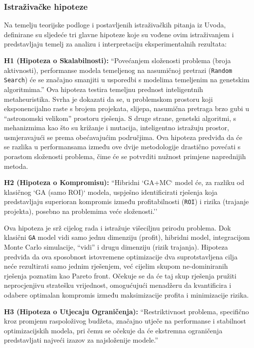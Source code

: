 \subsubsection{Istraživačke hipoteze}
Na temelju teorijske podloge i postavljenih istraživačkih pitanja iz Uvoda, definirane su sljedeće tri glavne hipoteze koje su vođene ovim istraživanjem i  predstavljaju temelj za analizu i interpretaciju eksperimentalnih rezultata:

\begin{description}

\item \textbf{H1 (Hipoteza o Skalabilnosti):} ``Povećanjem složenosti problema (broja aktivnosti), performanse modela temeljenog na nasumičnoj pretrazi (\texttt{Random Search}) će se značajno smanjiti u usporedbi s modelima temeljenim na genetskim algoritmima.''
Ova hipoteza testira temeljnu prednost inteligentnih metaheuristika. Svrha je dokazati da se, u problemskom prostoru koji eksponencijalno raste s brojem projekata, slijepa, nasumična pretraga brzo gubi u ``astronomski velikom'' prostoru rješenja. S druge strane, genetski algoritmi, s mehanizmima kao što su križanje i mutacija, inteligentno istražuju prostor, usmjeravajući se prema obećavajućim područjima. Ova hipoteza predviđa da će se razlika u performansama između ove dvije metodologije drastično povećati s porastom složenosti problema, čime će se potvrditi nužnost primjene naprednijih metoda.

\item \textbf{H2 (Hipoteza o Kompromisu):} ``Hibridni `GA+MC` model će, za razliku od klasičnog `GA (samo ROI)` modela, uspješno identificirati rješenja koja predstavljaju superioran kompromis između profitabilnosti (\texttt{ROI}) i rizika (trajanje projekta), posebno na problemima veće složenosti.''

Ova hipoteza je srž cijelog rada i istražuje višeciljnu prirodu problema. Dok klasični \texttt{GA} model vidi samo jednu dimenziju (profit), hibridni model, integracijom Monte Carlo simulacije, ``vidi'' i drugu dimenziju (rizik trajanja). Hipoteza predviđa da ova sposobnost istovremene optimizacije dva suprotstavljena cilja neće rezultirati samo jednim rješenjem, već cijelim skupom ne-dominiranih rješenja poznatim kao Pareto front. Očekuje se da će taj skup rješenja pružiti neprocjenjivu stratešku vrijednost, omogućujući menadžeru da kvantificira i odabere optimalan kompromis između maksimizacije profita i minimizacije rizika.

\item \textbf{H3 (Hipoteza o Utjecaju Ograničenja):} ``Restriktivnost problema, specifično kroz promjenu raspoloživog budžeta, značajno utječe na performanse i stabilnost optimizacijskih modela, pri čemu se očekuje da će ekstremna ograničenja predstavljati najveći izazov za najsloženije modele.''


\end{description}
